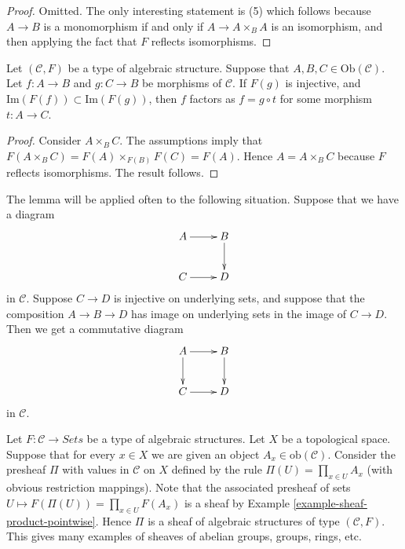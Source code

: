 \begin{proof}
Omitted. The only interesting statement is (5) which
follows because $A \to B$ is a monomorphism if and only if
$A \to A\times_BA$ is an isomorphism, and then applying
the fact that $F$ reflects isomorphisms.
\end{proof}

\begin{lemma}
\label{lemma-image-contained-in}
Let $(\mathcal{C}, F)$ be a type of algebraic structure.
Suppose that $A, B, C \in \text{Ob}(\mathcal{C})$.
Let $f : A \to B$ and $g : C \to B$ be morphisms of
$\mathcal{C}$. If $F(g)$ is injective, and
$\text{Im}(F(f)) \subset \text{Im}(F(g))$, then
$f$ factors as $f = g \circ t$ for some morphism
$t : A \to C$.
\end{lemma}

\begin{proof}
Consider $A \times_B C$. The assumptions imply that
$F(A \times_B C) = F(A) \times_{F(B)} F(C) = F(A)$.
Hence $A = A\times_B C$ because $F$ reflects isomorphisms.
The result follows.
\end{proof}

\begin{example}
\label{example-application-lemma-image-contained-in}
The lemma will be applied often to the following situation.
Suppose that we have a diagram
$$
\xymatrix{
A \ar[r] & B \ar[d] \\
C \ar[r] & D
}
$$
in $\mathcal{C}$. Suppose $C \to D$ is injective on underlying
sets, and suppose that the composition $A \to B \to D$ has
image on underlying sets in the image of $C \to D$.
Then we get a commutative diagram
$$
\xymatrix{
A \ar[r] \ar[d] & B \ar[d] \\
C \ar[r] & D
}
$$
in $\mathcal{C}$.
\end{example}

\begin{example}
\label{example-sheaf-product-pointwise-algebraic-structure}
Let $F : \mathcal{C} \to \textit{Sets}$ be a
type of algebraic structures.
Let $X$ be a topological space. Suppose that
for every $x \in X$ we are given an object
$A_x \in \text{ob}(\mathcal{C})$. Consider the presheaf
$\Pi$ with values in $\mathcal{C}$ on $X$ defined by the rule
$\Pi(U) = \prod_{x \in U} A_x$ (with obvious restriction
mappings). Note that the associated presheaf of sets
$U \mapsto F(\Pi(U)) = \prod_{x \in U} F(A_x)$ is a sheaf
by Example \ref{example-sheaf-product-pointwise}.
Hence $\Pi$ is a sheaf of algebraic structures
of type $(\mathcal{C} , F)$. This gives many examples
of sheaves of abelian groups, groups, rings, etc.
\end{example}













